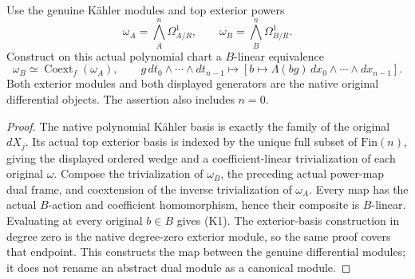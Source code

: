 \begin{theorem}
\label{thm:kn-nadel-kummer-canonical-module}
\leanok
Use the genuine K\"ahler modules and top exterior powers
\[
 \omega_A=\bigwedge_A^n\Omega^1_{A/R},\qquad
 \omega_B=\bigwedge_B^n\Omega^1_{B/R}.
\]
Construct on this actual polynomial chart a $B$-linear equivalence
\[
 \omega_B\simeq\operatorname{Coext}_f(\omega_A),\qquad
 g\,dt_0\wedge\cdots\wedge dt_{n-1}
 \longmapsto
 [b\mapsto\Lambda(bg)\,dx_0\wedge\cdots\wedge dx_{n-1}].
 \tag{K1}
\]
Both exterior modules and both displayed generators are the native
original differential objects.  The assertion also includes $n=0$.
\end{theorem}
\begin{proof}
The native polynomial K\"ahler basis is exactly the family of the
original $dX_j$.  Its actual top exterior basis is indexed by the
unique full subset of $\mathrm{Fin}(n)$, giving the displayed
ordered wedge and a coefficient-linear trivialization of each
original $\omega$.  Compose the trivialization of $\omega_B$,
the preceding actual power-map dual frame, and coextension of the
inverse trivialization of $\omega_A$.  Every map has the actual
$B$-action and coefficient homomorphism, hence their composite is
$B$-linear.  Evaluating at every original $b\in B$ gives (K1).
The exterior-basis construction in degree zero is the native
degree-zero exterior module, so the same proof covers that endpoint.
This constructs the map between the genuine differential modules;
it does not rename an abstract dual module as a canonical module.
\end{proof}

